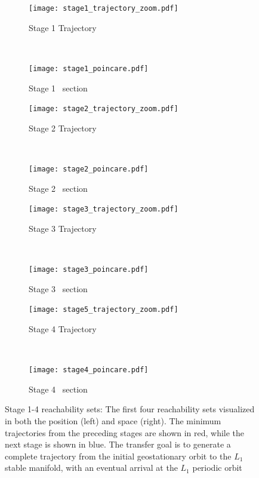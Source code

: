 \documentclass[smallcondensed]{svjour3}
\begin{document}
\begin{figure}[htbp]
    \centering
    \begin{subfigure}[htbp]{0.5\textwidth} 
        \texttt{[image: stage1\_trajectory\_zoom.pdf]} 
        \caption{Stage 1 Trajectory~\label{fig:stage1_trajecotry_zoom}} 
    \end{subfigure}~
    \begin{subfigure}[htbp]{0.5\textwidth} 
        \texttt{[image: stage1\_poincare.pdf]} 
        \caption{Stage 1 \Poincare~section \label{fig:stage1_poincare}} 
    \end{subfigure}


    \begin{subfigure}[htbp]{0.5\textwidth} 
        \texttt{[image: stage2\_trajectory\_zoom.pdf]} 
        \caption{Stage 2 Trajectory~\label{fig:stage2_trajecotry_zoom}} 
    \end{subfigure}~
    \begin{subfigure}[htbp]{0.5\textwidth} 
        \texttt{[image: stage2\_poincare.pdf]} 
        \caption{Stage 2 \Poincare~section \label{fig:stage2_poincare}} 
    \end{subfigure}

    \begin{subfigure}[htbp]{0.5\textwidth} 
        \texttt{[image: stage3\_trajectory\_zoom.pdf]} 
        \caption{Stage 3 Trajectory~\label{fig:stage3_trajecotry_zoom}} 
    \end{subfigure}~
    \begin{subfigure}[htbp]{0.5\textwidth} 
        \texttt{[image: stage3\_poincare.pdf]} 
        \caption{Stage 3 \Poincare~section \label{fig:stage3_poincare}} 
    \end{subfigure}
 
    \begin{subfigure}[htbp]{0.5\textwidth} 
        \texttt{[image: stage5\_trajectory\_zoom.pdf]} 
        \caption{Stage 4 Trajectory~\label{fig:stage4_trajecotry_zoom}} 
    \end{subfigure}~
    \begin{subfigure}[htbp]{0.5\textwidth} 
        \texttt{[image: stage4\_poincare.pdf]} 
        \caption{Stage 4 \Poincare~section \label{fig:stage4_poincare}} 
    \end{subfigure}   
    \caption{Stage 1-4 reachability sets: The first four reachability sets visualized in both the position (left) and \Poincare space (right).
        The minimum trajectories from the preceding stages are shown in red, while the next stage is shown in blue.
    The transfer goal is to generate a complete trajectory from the initial geostationary orbit to the \( L_1 \) stable manifold, with an eventual arrival at the \( L_1 \) periodic orbit~\label{fig:stage1to4_reachability}}
\end{figure}
\end{document}
